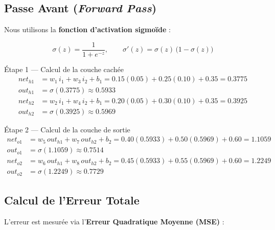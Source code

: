 \documentclass[12pt, a4paper]{article}
\begin{document}
\subsection{Passe Avant (\textit{Forward Pass})}

Nous utilisons la \textbf{fonction d'activation sigmoïde} :

\begin{mathbox}
\begin{equation}
    \sigma(z) = \frac{1}{1 + e^{-z}}, \qquad
    \sigma'(z) = \sigma(z)\,\bigl(1 - \sigma(z)\bigr)
    \label{eq:sigmoid}
\end{equation}
\end{mathbox}

\begin{stepbox}{Étape 1 — Calcul de la couche cachée}
\begin{align*}
    net_{h1} &= w_1\,i_1 + w_3\,i_2 + b_1
               = 0.15(0.05) + 0.25(0.10) + 0.35 = 0.3775 \\
    out_{h1} &= \sigma(0.3775) \approx \mathbf{0.5933} \\[6pt]
    net_{h2} &= w_2\,i_1 + w_4\,i_2 + b_1
               = 0.20(0.05) + 0.30(0.10) + 0.35 = 0.3925 \\
    out_{h2} &= \sigma(0.3925) \approx \mathbf{0.5969}
\end{align*}
\end{stepbox}

\vspace{0.4cm}

\begin{stepbox}{Étape 2 — Calcul de la couche de sortie}
\begin{align*}
    net_{o1} &= w_5\,out_{h1} + w_7\,out_{h2} + b_2
               = 0.40(0.5933) + 0.50(0.5969) + 0.60 = 1.1059 \\
    out_{o1} &= \sigma(1.1059) \approx \mathbf{0.7514} \\[6pt]
    net_{o2} &= w_6\,out_{h1} + w_8\,out_{h2} + b_2
               = 0.45(0.5933) + 0.55(0.5969) + 0.60 = 1.2249 \\
    out_{o2} &= \sigma(1.2249) \approx \mathbf{0.7729}
\end{align*}
\end{stepbox}

\subsection{Calcul de l'Erreur Totale}

L'erreur est mesurée via l'\textbf{Erreur Quadratique Moyenne (MSE)} :
\end{document}
